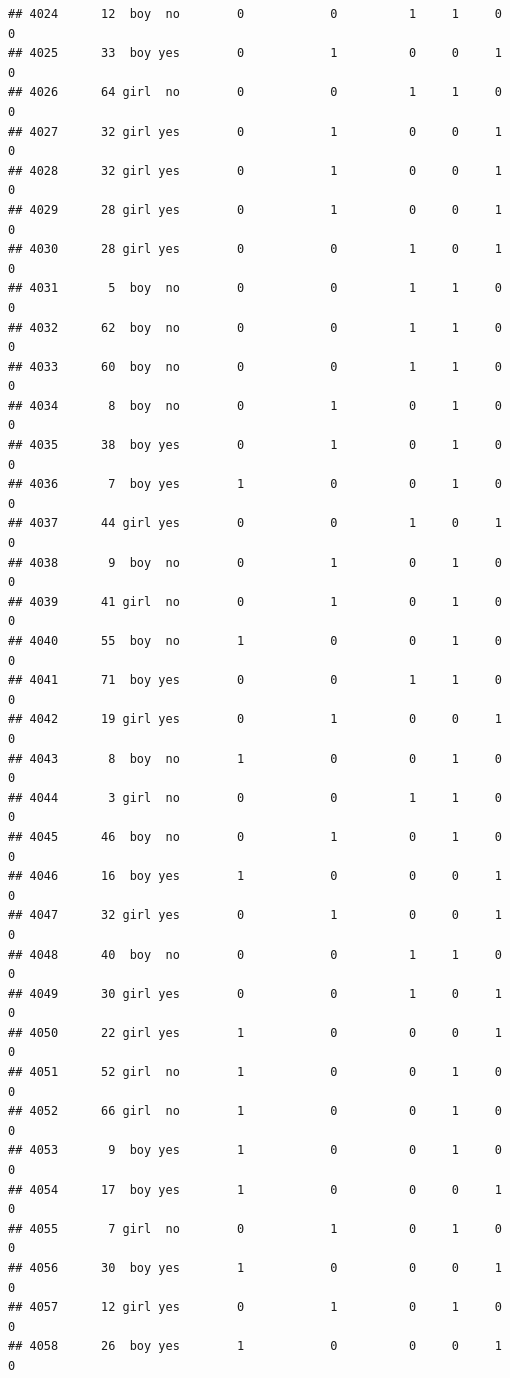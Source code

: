 \documentclass[man]{apa6}
\begin{document}
\begin{verbatim}
## 4024      12  boy  no        0            0          1     1     0     0
## 4025      33  boy yes        0            1          0     0     1     0
## 4026      64 girl  no        0            0          1     1     0     0
## 4027      32 girl yes        0            1          0     0     1     0
## 4028      32 girl yes        0            1          0     0     1     0
## 4029      28 girl yes        0            1          0     0     1     0
## 4030      28 girl yes        0            0          1     0     1     0
## 4031       5  boy  no        0            0          1     1     0     0
## 4032      62  boy  no        0            0          1     1     0     0
## 4033      60  boy  no        0            0          1     1     0     0
## 4034       8  boy  no        0            1          0     1     0     0
## 4035      38  boy yes        0            1          0     1     0     0
## 4036       7  boy yes        1            0          0     1     0     0
## 4037      44 girl yes        0            0          1     0     1     0
## 4038       9  boy  no        0            1          0     1     0     0
## 4039      41 girl  no        0            1          0     1     0     0
## 4040      55  boy  no        1            0          0     1     0     0
## 4041      71  boy yes        0            0          1     1     0     0
## 4042      19 girl yes        0            1          0     0     1     0
## 4043       8  boy  no        1            0          0     1     0     0
## 4044       3 girl  no        0            0          1     1     0     0
## 4045      46  boy  no        0            1          0     1     0     0
## 4046      16  boy yes        1            0          0     0     1     0
## 4047      32 girl yes        0            1          0     0     1     0
## 4048      40  boy  no        0            0          1     1     0     0
## 4049      30 girl yes        0            0          1     0     1     0
## 4050      22 girl yes        1            0          0     0     1     0
## 4051      52 girl  no        1            0          0     1     0     0
## 4052      66 girl  no        1            0          0     1     0     0
## 4053       9  boy yes        1            0          0     1     0     0
## 4054      17  boy yes        1            0          0     0     1     0
## 4055       7 girl  no        0            1          0     1     0     0
## 4056      30  boy yes        1            0          0     0     1     0
## 4057      12 girl yes        0            1          0     1     0     0
## 4058      26  boy yes        1            0          0     0     1     0

\end{verbatim}
\end{document}
